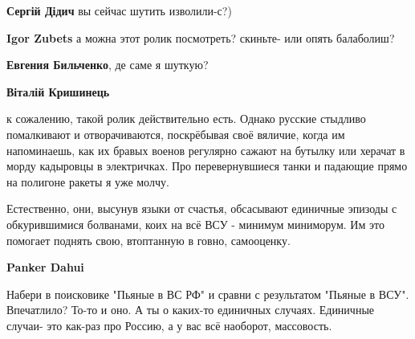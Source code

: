 \begin{itemize}
\begin{itemize}
 
\textbf{Сергій Дідич} вы сейчас шутить изволили-с?)

 
\textbf{Igor Zubets} а можна этот ролик посмотреть? скиньте- или опять балаболиш?

 
\textbf{Евгения Бильченко}, де саме я шуткую?

 
\textbf{Віталій Кришинець} 

к сожалению, такой ролик действительно есть. Однако русские стыдливо
помалкивают и отворачиваются, поскрёбывая своё вяличие, когда им напоминаешь,
как их бравых военов регулярно сажают на бутылку или херачат в морду кадыровцы
в электричках. Про перевернувшиеся танки и падающие прямо на полигоне ракеты я
уже молчу.

Естественно, они, высунув языки от счастья, обсасывают единичные эпизоды с
обкурившимися болванами, коих на всё ВСУ - минимум миниморум. Им это помогает
поднять свою, втоптанную в говно, самооценку.

 
\textbf{Panker Dahui} 

Набери в поисковике "Пьяные в ВС РФ" и сравни с результатом "Пьяные в ВСУ".
Впечатлило? То-то и оно. А ты о каких-то единичных случаях. Единичные случаи-
это как-раз про Россию, а у вас всё наоборот, массовость.



\end{itemize}
\end{itemize}
